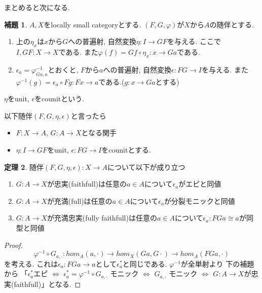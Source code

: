 \documentclass[dvipdfmx,a4paper,11pt]{article}
\theoremstyle{definition}
\newtheorem{thm}{定理}
\newtheorem{lem}[thm]{補題}
\begin{document}
まとめると次になる. 
 \begin{tcolorbox}
 [colback = white, colframe = green!35!black, fonttitle = \bfseries,breakable = true]
\begin{lem}
$A,X$をlocally small categoryとする.
$(F,G,\varphi)$が$X$から$A$の随伴とする.
\begin{enumerate}
\item 上の$\eta_{x}$は$x$から$G$への普遍射, 自然変換$\eta : I \to GF$を与える. ここで$I, GF: X \to X$である.
また$\varphi(f ) = Gf \circ \eta_x : x \to Ga$である.
\item $\epsilon_a = \varphi^{-1}_{Ga,a}$とおくと, $F$から$a$への普遍射, 自然変換$\epsilon : FG \to I$を与える. また$\varphi^{-1}(g) = \epsilon_{a} \circ Fg:  Fx \to a$である.($g : x \to Ga$とする)
\end{enumerate}
$\eta$をunit, $\epsilon$をcounitという. 
\end{lem}
\end{tcolorbox}
以下随伴$(F,G,\eta,\epsilon)$と言ったら
\begin{itemize}
\item $F :X \to A$, $G : A \to X$となる関手
\item $\eta : I \to GF$をunit, $\epsilon : FG \to I$をcounitとする.
\end{itemize}

 \begin{tcolorbox}
 [colback = white, colframe = green!35!black, fonttitle = \bfseries,breakable = true]
\begin{thm}
\label{thm-adjoint-fullyfaithfull}
随伴$(F,G,\eta,\epsilon): X \to A$について以下が成り立つ
\begin{enumerate}
\item $G : A \to X$が忠実(faithfull)は任意の$a \in A$について$\epsilon_a$がエピと同値
\item $G : A \to X$が充満(full)は任意の$a \in A$について$\epsilon_a$が分裂モニックと同値
\item $G : A \to X$が充満忠実(fully faithfull)は任意の$a \in A$について$\epsilon_a : FG a \cong a$が同型と同値
\end{enumerate}
\end{thm}
\end{tcolorbox}
\begin{proof}
$$
\varphi^{-1} \circ G_{a, \cdot}:
hom_{A}(a, \cdot)
\to 
hom_{X}(Ga, G\cdot)
\to 
hom_{A}(FGa, \cdot)
$$
を考える. これは$\epsilon_a : FGa \to a$として$\epsilon_{a}^{*}$と同じである.
$\varphi^{-1}$が全単射より 
下の補題から
「$\epsilon_{a}^{*}$エピ $\Leftrightarrow$ $\epsilon_{a}^{*} = \varphi^{-1} \circ G_{a, \cdot}$ モニック
$\Leftrightarrow$ $ G_{a, \cdot}$ モニック $\Leftrightarrow$ $G : A \to X$が忠実(faithfull)」となる.
\end{proof}
\end{document}
